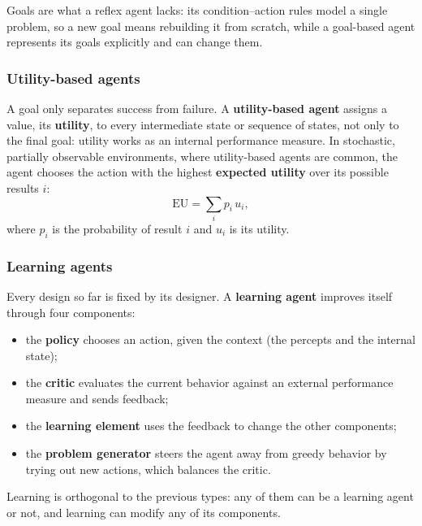 Goals are what a reflex agent lacks: its condition--action rules model a single
problem, so a new goal means rebuilding it from scratch, while a goal-based
agent represents its goals explicitly and can change them.

\subsubsection{Utility-based agents}\label{sec:agents-utility}

A goal only separates success from failure. A \textbf{utility-based agent}
assigns a value, its \textbf{utility}, to every intermediate state or sequence
of states, not only to the final goal: utility works as an internal performance
measure. In stochastic, partially observable environments, where utility-based
agents are common, the agent chooses the action with the highest
\textbf{expected utility} over its possible results $i$:
\[
  \mathrm{EU} = \sum_{i} p_i \, u_i,
\]
where $p_i$ is the probability of result $i$ and $u_i$ is its utility.

\subsubsection{Learning agents}\label{sec:agents-learning}

Every design so far is fixed by its designer. A \textbf{learning agent} improves
itself through four components:
\begin{itemize}
  \item the \textbf{policy} chooses an action, given the context (the percepts
    and the internal state);
  \item the \textbf{critic} evaluates the current behavior against an external
    performance measure and sends feedback;
  \item the \textbf{learning element} uses the feedback to change the other
    components;
  \item the \textbf{problem generator} steers the agent away from greedy
    behavior by trying out new actions, which balances the critic.
\end{itemize}
Learning is orthogonal to the previous types: any of them can be a learning
agent or not, and learning can modify any of its components.

